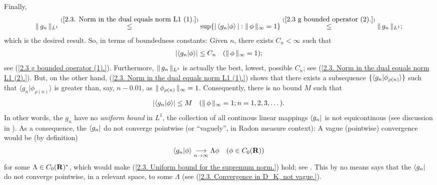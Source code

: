 %
Finally, %
%
  \begin{align}\label{2.3. Norm in the dual equals norm L1 (2).}
    \norm{L^1}{g_n}
      \citeleq{\ref{2.3. Norm in the dual equals norm L1 (1).}} 
    \sup\set{
    \magnitude{\bra{g_n}\ket{\phi}}
    }{
      \norm{\infty}{\phi} = 1
    }
      \citeleq{\ref{2.3  g  bounded operator (2).}}
    \norm{L^1}{g_n};
  \end{align}  %
%
which is the desired result. %
%
So, in terms of boundedness constants: %
Given $n$, there exists $C_{n} < \infty$ such that 
    \begin{align}\label{2.3. Optimal bound.}
      \left\lvert 
        \bra{g_n}\ket{\phi} 
      \right\rvert 
        \leq 
      C_{n} \quad (\norm{\infty}{\phi} = 1); 
    \end{align}
see (\ref{2.3  g  bounded operator (1).}). 
Furthermore, %
%
  $\norm{L^1}{g_n}$ is actually the best, \ie lowest, possible $C_{n}$; see %
    (\ref{2.3. Norm in the dual equals norm L1 (2).}). %
But, on the other hand, %
%
  (\ref{2.3. Norm in the dual equals norm L1 (1).}) %
%
shows that there exists a subsequence %
%
  $\singleton{\langle{g_n}\lvert{\phi_{\rho(n)}}\rangle}$ %
%
such that %
%
  $\langle{g_n}\lvert{\phi_{\rho(n)}}\rangle$ %
% 
is greater than, say, $n -0.01$, as $\norm{\infty}{\phi_{\rho(n)}} = 1$. %
%
Consequently, there is no bound $M$ such that %
%
  \begin{align}\label{2.3. Uniform bound for the supremum norm.}
    \left\lvert 
      \bra{g_n}\ket{\phi} 
    \right\rvert 
      \leq M
    \quad (\norm{\infty}{\phi} = 1; \counting{n}).
  \end{align}
%
In other words, the $g_n$ have no \textit{uniform bound} in ${L^1}$, %
  \ie %
the collection of all continous linear mappings %
%
  $\bra{g_n}$ %
%
is not equicontinous %
%
  (see discussion in ). %
%
As a consequence, %
%
  the $\bra{g_n}$ %
%
do not converge pointwise (or ``vaguely'', in Radon measure context): %
A vague (\ie pointwise) convergence would be (by definition) %
%
  \begin{align}
    \bra{g_n}\ket{\phi} \tendsto{n}{\infty} \Lambda \phi %
    \quad (\phi \in C_0(\R)) %
  \end{align}
%
for some $\Lambda\in C_0(\R)^\ast$, which would make %
%
  (\ref{2.3. Uniform bound for the supremum norm.})
%
hold; see . %
%
This by no means says that the %
%
  $\bra{g_n}$ %
%
do not converge pointwise, in a relevant space, to some $\Lambda$ (see %
%
  (\ref{2.3. Convergence in D_K, not vague.}). %
%
\newline\newline\noindent
